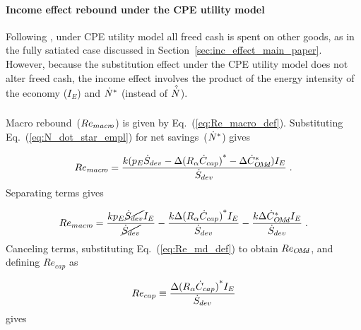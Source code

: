 \paragraph{Income effect rebound under the CPE utility model}
\label{sec:income_effect_CPE}

Following \citet{Borenstein:2015aa},
under CPE utility model
all freed cash is spent on other goods,
as in the fully satiated case discussed
in Section~\ref{sec:inc_effect_main_paper}.
However, because the substitution effect
under the CPE utility model
does not alter freed cash,
the income effect
involves the product of
the energy intensity of the economy ($I_E$)
and ${\dot{N}}^*$
(instead of $\hat{\dot{N}}$).


\subsubsection{\Macroeffect{}}
\label{sec:Re_macro}

Macro rebound~($Re_{macr\!o}$) is given by Eq.~(\ref{eq:Re_macro_def}).
Substituting Eq.~(\ref{eq:N_dot_star_empl}) for net savings~(${\dot{N}}^*$) gives

\begin{equation}
  Re_{macr\!o} = \frac{k (p_E \dot{S}_{dev} - \Delta {(R_\alpha \dot{C}_{cap})}^* - \Delta {\dot{C}}^*_{O\!M\!d}) I_E}{\dot{S}_{dev}} \; .
\end{equation}
%
Separating terms gives

\begin{equation}
  Re_{macr\!o} = \frac{k p_E \cancel{\dot{S}_{dev}} I_E}{\cancel{\dot{S}_{dev}}}
                                - \frac{k \Delta {(R_\alpha  \dot{C}_{cap})}^* I_E}{\dot{S}_{dev}}
                                - \frac{k \Delta {\dot{C}}^*_{O\!M\!d} I_E}{\dot{S}_{dev}} \; .
\end{equation}
%
Canceling terms, substituting Eq.~(\ref{eq:Re_md_def}) to obtain $Re_{O\!M\!d}$, and
defining $Re_{cap}$ as

\begin{equation} \label{eq:Re_cap}
  Re_{cap} \equiv \frac{\Delta {(R_\alpha \dot{C}_{cap})}^* I_E}{\dot{S}_{dev}}{}
\end{equation}
%
gives

